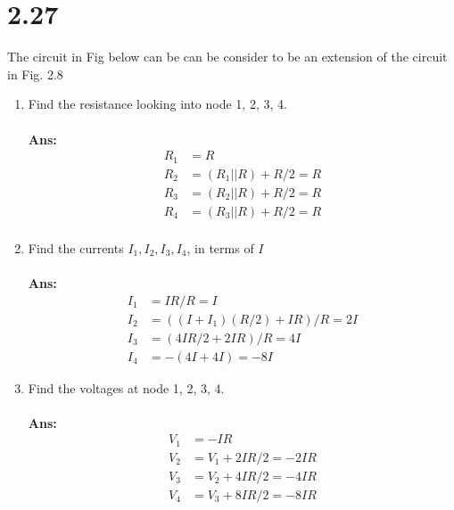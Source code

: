 \documentclass[12pt, a4paper]{article}
\newcommand{\Ans}{{\\ \bf Ans:} \\}
\begin{document}
\section{2.27}
The circuit in Fig below can be can be consider to be an extension of the circuit in Fig. 2.8


\begin{enumerate}[label=(\alph*)]
  \item Find the resistance looking into node 1, 2, 3, 4.\\
    \Ans
    \begin{align*}
      R_1 &= R\\
      R_2 &= (R_1 || R) + R / 2 = R\\
      R_3 &= (R_2 || R) + R / 2 = R\\
      R_4 &= (R_3 || R) + R / 2 = R\\
    \end{align*}
  \item Find the currents $I_1, I_2, I_3, I_4$, in terms of $I$\\
    \Ans
    \begin{align*}
      I_1 &= IR / R = I\\
      I_2 &= ((I+I_1) (R/2) + IR) / R= 2I\\
      I_3 &= (4IR/2 + 2IR)/R = 4I \\
      I_4 &= -(4I + 4I) = -8I 
    \end{align*}
  \item Find the voltages at node 1, 2, 3, 4.\\
    \Ans
    \begin{align*}
      V_1 &= -IR               \\
      V_2 &= V_1 + 2IR/2 = -2IR\\
      V_3 &= V_2 + 4IR/2 = -4IR\\
      V_4 &= V_3 + 8IR/2 = -8IR
    \end{align*}
\end{enumerate}
\end{document}
